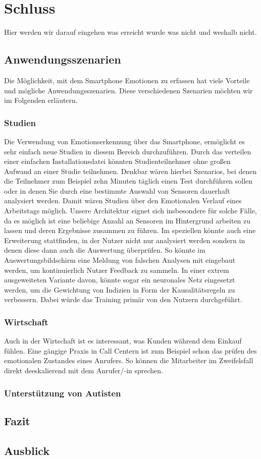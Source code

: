 \section{Schluss}
Hier werden wir darauf eingehen was erreicht wurde was nicht und weshalb nicht.
\subsection{Anwendungsszenarien}
Die Möglichkeit, mit dem Smartphone Emotionen zu erfassen hat viele Vorteile und mögliche Anwendungsszenarien. Diese verschiedenen Szenarien möchten wir im Folgenden erläutern.
\subsubsection{Studien}
Die Verwendung von Emotionserkennung über das Smartphone, ermöglicht es sehr einfach neue Studien in diesem Bereich durchzuführen. Durch das verteilen einer einfachen Installationsdatei könnten Studienteilnehmer ohne großen Aufwand an einer Studie teilnehmen. Denkbar wären hierbei Szenarios, bei denen die Teilnehmer zum Beispiel zehn Minuten täglich einen Test durchführen sollen oder in denen Sie durch eine bestimmte Auswahl von Sensoren dauerhaft analysiert werden. Damit wären Studien über den Emotionalen Verlauf eines Arbeitstags möglich.\newline
Unsere Architektur eignet sich insbesondere für solche Fälle, da es möglich ist eine beliebige Anzahl an Sensoren im Hintergrund arbeiten zu lassen und deren Ergebnisse zusammen zu führen. Im speziellen könnte auch eine Erweiterung stattfinden, in der Nutzer nicht nur analysiert werden sondern in denen diese dann auch die Auswertung überprüfen. So könnte im Auswertungsbildschirm eine Meldung von falschen Analysen mit eingebaut werden, um kontinuierlich Nutzer Feedback zu sammeln. In einer extrem ausgeweiteten Variante davon, könnte sogar ein neuronales Netz eingesetzt werden, um die Gewichtung von Indizien in Form der Kausalitätsregeln zu verbessern. Dabei würde das Training primär von den Nutzern durchgeführt. 
\subsubsection{Wirtschaft}
Auch in der Wirtschaft ist es interessant, was Kunden während dem Einkauf fühlen. Eine gängige Praxis in Call Centern ist zum Beispiel schon das prüfen des emotionalen Zustandes eines Anrufers. So können die Mitarbeiter im Zweifelsfall direkt deeskalierend mit dem Anrufer/-in sprechen.
\subsubsection{Unterstützung von Autisten}
\subsection{Fazit}

\subsection{Ausblick}
